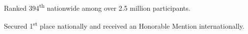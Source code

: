 
  \begin{Highlights}
    \item Ranked 394\textsuperscript{th} nationwide among over 2.5 million participants.
  \end{Highlights}

  \begin{Highlights}
    \item Secured 1\textsuperscript{st} place nationally and received an Honorable Mention internationally.
  \end{Highlights}
